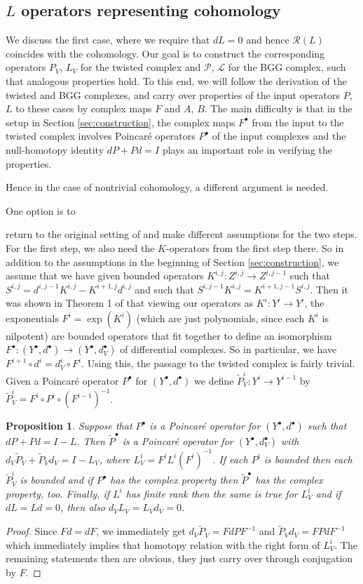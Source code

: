 \documentclass[11pt]{amsart}
\newtheorem{proposition}{Proposition}
\newcommand{\0}{\mathaccent23}
\newcommand\ran{\mathcal{R}}
\newcommand{\bs}{{\scriptscriptstyle \bullet}}
\begin{document}
\subsection{$L$ operators representing cohomology}
We discuss the first case, where we require that $dL=0$ and hence $\ran(L)$ coincides with the cohomology. Our goal is to construct the corresponding operators $P_{V}$, $L_{V}$ for the twisted complex and $\mathscr{P}$, $\mathscr{L}$ for the BGG complex, such that analogous properties hold. To this end, we will follow the derivation of the twisted and BGG complexes, and carry over properties of the input operators $P$, $L$ to these cases by complex maps $F$ and $A$, $B$. The main difficulty is that in the setup in Section \ref{sec:construction}, the complex maps $F^{\bs}$ from the input to the twisted complex involves Poincar\'e operators $P^{\bs}$ of the input complexes and the null-homotopy identity $dP+Pd=I$ plays an important role in verifying the properties. {Hence in the case of nontrivial cohomology, a different argument is needed.

One option is to 
}
return to the original setting of \cite{vcap2022bgg} and make different assumptions for the two steps. For the first step, we also need the $K$-operators from the first step there. So in addition to the assumptions in the beginning of Section  \ref{sec:construction}, we assume that we have given bounded operators $K^{i,j}:Z^{i,j}\to Z^{i,j-1}$ such that $S^{i,j}=d^{i,j-1}K^{i,j}-K^{i+1,j}d^{i,j}$ and such that $S^{i,j-1}K^{i,j}=K^{i+1,j-1}S^{i,j}$. Then it was shown in Theorem 1 of \cite{vcap2022bgg} that viewing our operators as $K^i:Y^i\to Y^i$, the exponentials $F^i=\exp(K^i)$ (which are just polynomials, since each $K^i$ is nilpotent) are bounded operators that fit together to define an isomorphism $F^\bs:(Y^\bs,d^\bs)\to (Y^\bs,d_V^\bs)$ of differential complexes. So in particular, we have $F^{i+1}\circ d^i=d^i_V\circ F^i$. Using this, the passage to the twisted complex is fairly trivial. Given a Poincar\'e operator $P^\bs$ for $(Y^\bs,d^\bs)$ we define $\tilde P^i_V:Y^i\to Y^{i-1}$ by $\tilde P^i_V= F^i\circ P^i\circ (F^{i-1})^{-1}$.

\begin{proposition}\label{prop:sharp-cohom-twisted}
Suppose that $P^\bs$ is a Poincar\'e operator for $(Y^\bs,d^\bs)$ such that $dP+Pd=I-L$. Then $\tilde P^\bs$ is a Poincar\'e operator for $(Y^\bs,d_V^\bs)$ with $d_V\tilde P_V+\tilde P_Vd_V=I-L_V$, where $L^i_V=F^iL^i(F^i)^{-1}$. If each $P^i$ is bounded then each $\tilde P_V^i$ is bounded and if $P^\bs$ has the complex property then $\tilde P^\bs$ has the complex property, too. Finally, if $L^i$ has finite rank then the same is true for $L^i_V$ and if $dL=Ld=0$, then also $d_VL_V=L_Vd_V=0$.  
\end{proposition}
\begin{proof}
Since $Fd=dF$, we immediately get $d_V\tilde P_V=FdPF^{-1}$ and $\tilde P_Vd_V=FPdF^{-1}$ which immediately implies that homotopy relation with the right form of $L^i_V$. The remaining statements then are obvious, they just carry over through conjugation by $F$. 
\end{proof}
\end{document}
